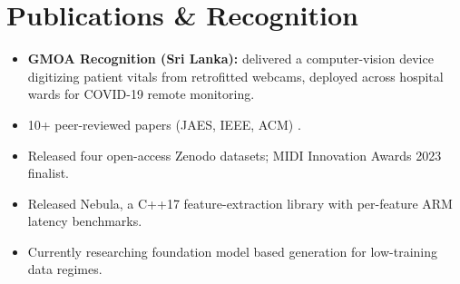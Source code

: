 \documentclass[11pt]{article}
\begin{document}
\enlargethispage{3\baselineskip}
\section*{Publications \& Recognition}

\begin{itemize}[leftmargin=1.2em, itemsep=-0.25em]

    \item \textbf{GMOA Recognition (Sri Lanka):} delivered a computer-vision device digitizing patient vitals from retrofitted webcams, deployed across hospital wards for COVID-19 remote monitoring.
    \item 10+ peer-reviewed papers (JAES, IEEE, ACM) {}.
    \item Released four open-access Zenodo datasets; MIDI Innovation Awards 2023 finalist.
    \item Released Nebula, a C++17 feature-extraction library with per-feature ARM latency benchmarks.
    \item Currently researching foundation model based generation for low-training data regimes.
    


\end{itemize}
\end{document}

